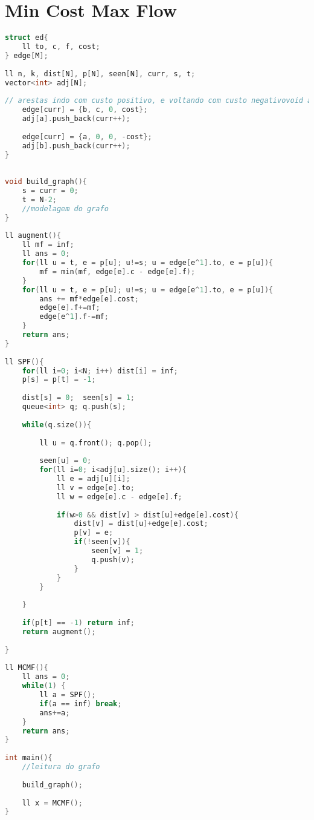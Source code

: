 \documentclass[12pt,a4paper,twoside]{report}
\begin{document}
\section{Min Cost Max Flow}
\noindent\begin{lstlisting}[caption=Min Cost Max Flow,language=C++]
struct ed{
    ll to, c, f, cost;
} edge[M];
 
ll n, k, dist[N], p[N], seen[N], curr, s, t;
vector<int> adj[N];
 
// arestas indo com custo positivo, e voltando com custo negativovoid add_edge(ll a, ll b, ll c, ll cost){
    edge[curr] = {b, c, 0, cost};
    adj[a].push_back(curr++);
     
    edge[curr] = {a, 0, 0, -cost};
    adj[b].push_back(curr++);
}
 
 
void build_graph(){
    s = curr = 0;
    t = N-2;
    //modelagem do grafo
}
 
ll augment(){
    ll mf = inf;
    ll ans = 0;
    for(ll u = t, e = p[u]; u!=s; u = edge[e^1].to, e = p[u]){
        mf = min(mf, edge[e].c - edge[e].f);
    }
    for(ll u = t, e = p[u]; u!=s; u = edge[e^1].to, e = p[u]){
        ans += mf*edge[e].cost;
        edge[e].f+=mf;
        edge[e^1].f-=mf;
    }
    return ans;
}
 
ll SPF(){    
    for(ll i=0; i<N; i++) dist[i] = inf;
    p[s] = p[t] = -1;
     
    dist[s] = 0;  seen[s] = 1;
    queue<int> q; q.push(s);
     
    while(q.size()){
         
        ll u = q.front(); q.pop();
         
        seen[u] = 0;
        for(ll i=0; i<adj[u].size(); i++){
            ll e = adj[u][i];
            ll v = edge[e].to;
            ll w = edge[e].c - edge[e].f;
             
            if(w>0 && dist[v] > dist[u]+edge[e].cost){
                dist[v] = dist[u]+edge[e].cost;
                p[v] = e;
                if(!seen[v]){
                    seen[v] = 1;
                    q.push(v);
                }
            }
        }
         
    }
     
    if(p[t] == -1) return inf;
    return augment();
     
}
 
ll MCMF(){
    ll ans = 0;
    while(1) {
        ll a = SPF();
        if(a == inf) break;
        ans+=a;
    }
    return ans;
}
 
int main(){
    //leitura do grafo
     
    build_graph();
     
    ll x = MCMF();
}
\end{lstlisting}
\end{document}
